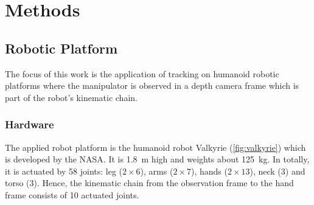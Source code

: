 \chapter{Methods}
\label{sec:methods}

\section{Robotic Platform}

The focus of this work is the application of tracking on humanoid robotic platforms where the manipulator is observed in a depth camera frame which is part of the robot's kinematic chain.

\subsection{Hardware}

The applied robot platform is the humanoid robot Valkyrie (\cref{fig:valkyrie}) which is developed by the NASA. It is \SI{1.8}{\meter} high and weights about \SI{125}{\kilo\gram}. In totally, it is actuated by 58 joints: leg ($2 \times 6$), arms ($2 \times 7$), hands ($2 \times 13$), neck (3) and torso (3). Hence, the kinematic chain from the observation frame to the hand frame consists of 10 actuated joints.

